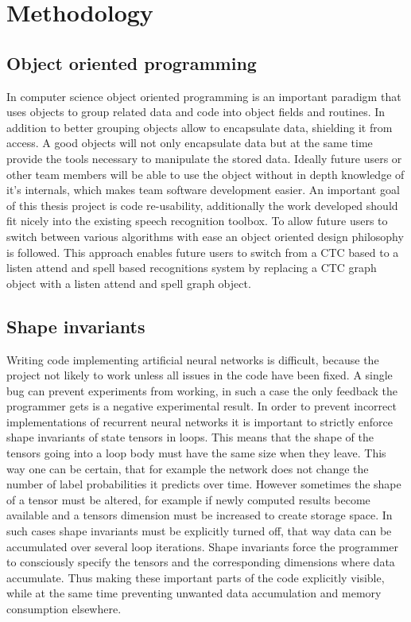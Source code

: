 \chapter{Methodology}
\label{cha:methods}

\section{Object oriented programming}
In computer science object oriented programming is an important paradigm that uses objects to group related data and code into object fields and routines. In addition to better grouping objects allow to encapsulate data, shielding it from access. A good objects will not only encapsulate data but at the same time provide the tools necessary to manipulate the stored data. Ideally future users or other team members will be able to use the object without in depth knowledge of it's internals, which makes team software development easier.  
An important goal of this thesis project is code re-usability, additionally the work developed should fit nicely into the existing speech recognition toolbox. To allow future users to switch between various algorithms with ease an object oriented design philosophy is followed. This approach enables future users to switch from a CTC based to a listen attend and spell based recognitions system by replacing a CTC graph object with a listen attend and spell graph object.

\section{Shape invariants}
Writing code implementing artificial neural networks is difficult, because the project not likely to work unless all issues in the code have been fixed. A single bug can prevent experiments from working, in such a case the only feedback the programmer gets is a negative experimental result. In order to prevent incorrect implementations of recurrent neural networks it is important to strictly enforce shape invariants of state tensors in loops. This means that the shape of the tensors going into a loop body must have the same size when they leave. This way one can be certain, that for example the network does not change the number of label probabilities it predicts over time.
However sometimes the shape of a tensor must be altered, for example if newly computed results become available and a tensors dimension must be increased to create storage space. 
In such cases shape invariants must be explicitly turned off, that way data can be accumulated over several loop iterations. Shape invariants force the programmer to consciously specify the tensors and the corresponding dimensions where data accumulate. Thus making these important parts of the code explicitly visible, while at the same time preventing unwanted data accumulation and memory consumption elsewhere.  


